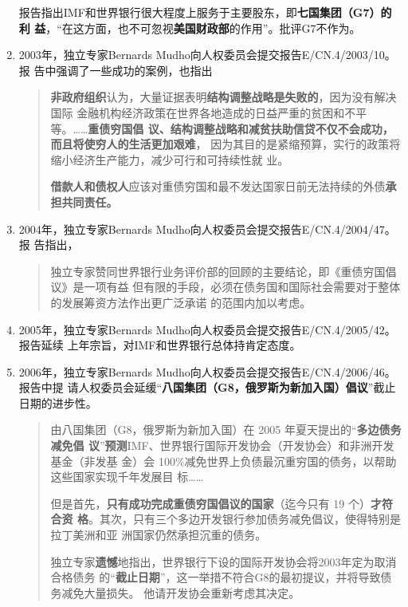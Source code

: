 \begin{enumerate}
  报告指出IMF和世界银行很大程度上服务于主要股东，即\textbf{七国集团（G7）的利
    益}，“在这方面，也不可忽视\textbf{美国财政部}的作用”。批评G7不作为。

\item 2003年，独立专家Bernards Mudho向人权委员会提交报告E/CN.4/2003/10。报
  告中强调了一些成功的案例，也指出
  \begin{quotation}
    \textbf{非政府组织}认为，大量证据表明\textbf{结构调整战略是失败的}，因为没有解决国际
    金融机构经济政策在世界各地造成的日益严重的贫困和不平等。……\textbf{重债穷国倡
      议、结构调整战略和减贫扶助信贷不仅不会成功，而且将使穷人的生活更加艰难}，
    因为其目的是紧缩预算，实行的政策将缩小经济生产能力，减少可行和可持续性就
    业。

    \textbf{借款人和债权人}应该对重债穷国和最不发达国家日前无法持续的外债\textbf{承担共同责任。}
  \end{quotation}

\item 2004年，独立专家Bernards Mudho向人权委员会提交报告E/CN.4/2004/47。报
  告指出，
  \begin{quotation}
    独立专家赞同世界银行业务评价部的回顾的主要结论，即《重债穷国倡议》是一项有益
    但有限的手段，必须在债务国和国际社会需要对于整体的发展筹资方法作出更广泛承诺
    的范围内加以考虑。
  \end{quotation}

\item 2005年，独立专家Bernards Mudho向人权委员会提交报告E/CN.4/2005/42。报告延续
  上年宗旨，对IMF和世界银行总体持肯定态度。

\item 2006年，独立专家Bernards Mudho向人权委员会提交报告E/CN.4/2006/46。报告中提
  请人权委员会延缓“\textbf{八国集团（G8，俄罗斯为新加入国）倡议}”截止日期的进步性。
  \begin{quotation}
    由八国集团（G8，俄罗斯为新加入国）在 2005 年夏天提出的“\textbf{多边债务减免倡
      议}”\textbf{预测}IMF、世界银行国际开发协会（开发协会）和非洲开发基金（非发基
    金）会 100\%减免世界上负债最沉重穷国的债务，以帮助这些国家实现千年发展目
    标……

    但是首先，\textbf{只有成功完成重债穷国倡议的国家}（迄今只有 19 个）\textbf{才符合资
      格}。其次，只有三个多边开发银行参加债务减免倡议，使得特别是拉丁美洲和亚
    洲国家仍然承担沉重的债务。

    独立专家\textbf{遗憾}地指出，世界银行下设的国际开发协会将2003年定为取消合格债务
    的“\textbf{截止日期}”，这一举措不符合G8的最初提议，并将导致债务减免大量损失。
    他请开发协会重新考虑其决定。
  \end{quotation}


\end{enumerate}
